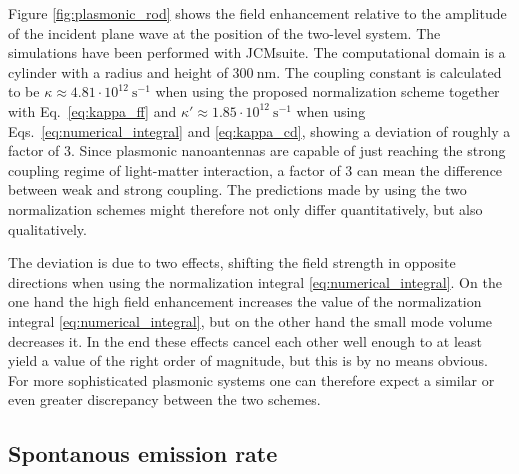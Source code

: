 \documentclass[10pt,letterpaper]{article}
\begin{document}
Figure \ref{fig:plasmonic_rod} shows the field enhancement relative to the amplitude of the incident plane wave at the position of the two-level system. The simulations have been performed with JCMsuite. The computational domain is a cylinder with a radius and height of $300~\text{nm}$. The coupling constant is calculated to be $\kappa\approx4.81\cdot10^{12}~\text{s}^{-1}$ when using the proposed normalization scheme together with Eq.~\eqref{eq:kappa_ff} and $\kappa'\approx1.85\cdot10^{12}~\text{s}^{-1}$ when using Eqs.~\eqref{eq:numerical_integral} and \eqref{eq:kappa_cd}, showing a deviation of roughly a factor of $3$. Since plasmonic nanoantennas are capable of just reaching the strong coupling regime of light-matter interaction, a factor of $3$ can mean the difference between weak and strong coupling. The predictions made by using the two normalization schemes might therefore not only differ quantitatively, but also qualitatively.

The deviation is due to two effects, shifting the field strength in opposite directions when using the normalization integral \eqref{eq:numerical_integral}. On the one hand the high field enhancement increases the value of the normalization integral \eqref{eq:numerical_integral}, but on the other hand the small mode volume decreases it. In the end these effects cancel each other well enough to at least yield a value of the right order of magnitude, but this is by no means obvious. For more sophisticated plasmonic systems one can therefore expect a similar or even greater discrepancy between the two schemes.

\subsection{Spontanous emission rate}
\end{document}
